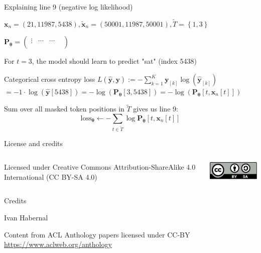\documentclass[12pt,aspectratio=169,handout]{beamer}
\begin{document}
\begin{frame}{Explaining line 9 (negative log likelihood)}
	
	\begin{small}
		$\bm{x}_n = (21, 11987, 5438), \bm{\tilde{x}}_n = (50001, 11987, 50001), \tilde{T} = \left\{ 1, 3 \right\}$
		
		$
		\bm{P_{\theta}} =
		\begin{pmatrix}
			\vdots &  \cdots &  \cdots &  \\
		\end{pmatrix}
		$
	\end{small}	
	
	For $t = 3$, the model should learn to predict "sat" (index 5438)
	
	\begin{block}{Categorical cross entropy loss}
		$L (\bm{\hat{y}, \bm{y}}) := - \sum_{k = 1}^{K} \bm{y}_{[k]} \log \left(  \bm{\hat{y}}_{[k]} \right)$ \\
		$= - 1 \cdot \log (\bm{\hat{y}}[5438])
		= - \log(\bm{P_{\theta}}[3, 5438])
		= - \log(\bm{P_{\theta}}[t, \bm{x}_n[t]])$	
	\end{block}
	

Sum over all masked token positions in $\tilde{T}$ gives us line 9:\\
$$\text{loss}_{\bm{\theta}} \gets - \sum_{t \in \tilde{T}} \log \bm{P_{\theta}} [t, \bm{x}_n[t]] $$
	
\end{frame}


\begin{frame}{License and credits}

	\begin{columns}
		\begin{column}{0.7\textwidth}
			Licensed under Creative Commons Attribution-ShareAlike 4.0 International (CC BY-SA 4.0)
		\end{column}
		\begin{column}{0.2\textwidth}
			\includegraphics[width=0.9\linewidth]{img/cc-by-sa-icon.pdf}
		\end{column}
	\end{columns}
	
	\bigskip
	
	Credits
	
	\begin{scriptsize}
		
		Ivan Habernal
		
		Content from ACL Anthology papers licensed under CC-BY \url{https://www.aclweb.org/anthology}
		
	
	\end{scriptsize}
	
\end{frame}
\end{document}
